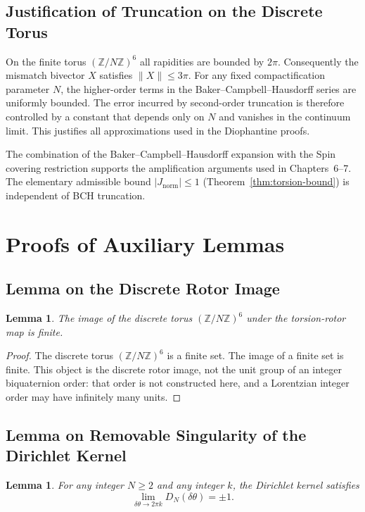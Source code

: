 \documentclass[a4paper]{article}
\newtheorem{lemma}[theorem]{Lemma}
\theoremstyle{definition}
\theoremstyle{remark}
\newcommand{\Jnorm}{J_{\mathrm{norm}}}
\begin{document}
\subsection{Justification of Truncation on the Discrete Torus}

On the finite torus \( (\mathbb{Z}/N\mathbb{Z})^6 \) all rapidities are bounded by \( 2\pi \). Consequently the mismatch bivector \( X \) satisfies \( \|X\| \leq 3\pi \). For any fixed compactification parameter \( N \), the higher-order terms in the Baker--Campbell--Hausdorff series are uniformly bounded. The error incurred by second-order truncation is therefore controlled by a constant that depends only on \( N \) and vanishes in the continuum limit. This justifies all approximations used in the Diophantine proofs.

The combination of the Baker--Campbell--Hausdorff expansion with the Spin covering restriction supports the amplification arguments used in Chapters~6--7. The elementary admissible bound \(|\Jnorm| \leq 1\) (Theorem~\ref{thm:torsion-bound}) is independent of BCH truncation.

\section{Proofs of Auxiliary Lemmas}

\subsection{Lemma on the Discrete Rotor Image}

\begin{lemma}
The image of the discrete torus \( (\mathbb{Z}/N\mathbb{Z})^6 \) under the torsion-rotor map is finite.
\end{lemma}

\begin{proof}
The discrete torus \( (\mathbb{Z}/N\mathbb{Z})^6 \) is a finite set. The image of a finite set is finite. This object is the discrete rotor image, not the unit group of an integer biquaternion order: that order is not constructed here, and a Lorentzian integer order may have infinitely many units.
\end{proof}

\subsection{Lemma on Removable Singularity of the Dirichlet Kernel}

\begin{lemma}
For any integer \( N \geq 2 \) and any integer \( k \), the Dirichlet kernel satisfies
\[
\lim_{\delta\theta \to 2\pi k} D_N(\delta\theta) = \pm 1.
\]
\end{lemma}
\end{document}
